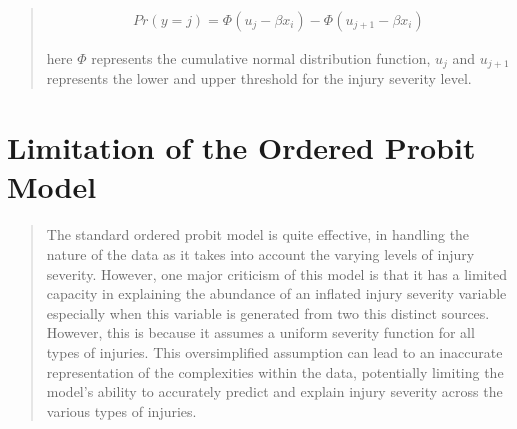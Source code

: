 \documentclass[12]{report}
\begin{document}
\begin{quote}
{\begin{fleqn}
\begin{align*}
Pr(y = j) = \Phi(u_{j} - \beta x_i) - \Phi(u_{j+1} - \beta x_i)
\tag{4.2.3}
\end{align*}
\end{fleqn}

here $\Phi$ represents the cumulative normal distribution function, $u_{j}$ and $u_{j+1}$ represents the lower and upper threshold for the injury severity level.

}\end{quote}

\section{Limitation of the Ordered Probit Model}
\begin{quote}
{\large 
The standard ordered probit model is quite effective, in handling the nature of the data as it takes into account the varying levels of injury severity. However, one major criticism of this model is that it has a limited capacity in explaining the abundance of an inflated  injury severity variable especially when this variable is generated from two this distinct sources. However, this is because it assumes a uniform severity function for all types of injuries. This oversimplified assumption can lead to an inaccurate representation of the complexities within the data, potentially limiting the model's ability to accurately predict and explain injury severity across the various types of injuries.

}\end{quote}
\end{document}
